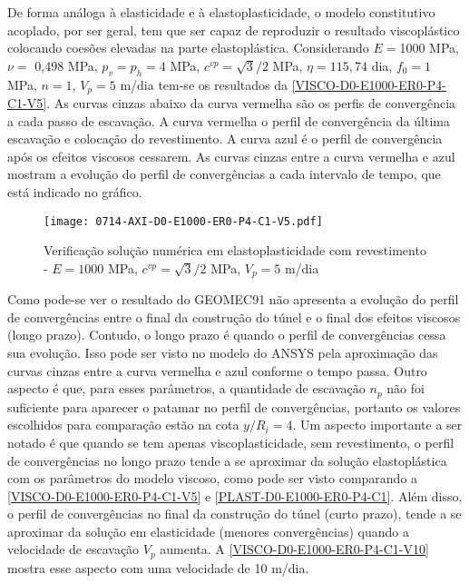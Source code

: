 De forma análoga à elasticidade e à elastoplasticidade, o modelo constitutivo acoplado, por ser geral, tem que ser capaz de reproduzir o resultado viscoplástico colocando coesões elevadas na parte elastoplástica.  Considerando $E =$1000  MPa, $\nu =$ 0,498 MPa, $p_v = p_h = 4$ MPa, $c^{vp} = \sqrt{3}/2$ MPa, $\eta = 115,74$ dia, $f_0=1$ MPa, $n=1$, $V_p = 5$ m/dia tem-se os resultados da \autoref{VISCO-D0-E1000-ER0-P4-C1-V5}. As curvas cinzas abaixo da curva vermelha são os perfis de convergência a cada passo de escavação. A curva vermelha o perfil de convergência da última escavação e colocação do revestimento. A curva azul é o perfil de convergência após os efeitos viscosos cessarem. As curvas cinzas entre a curva vermelha e azul mostram a evolução do perfil de convergências a cada intervalo de tempo, que está indicado no gráfico.
\begin{figure}[H]
	\begin{center}
		\texttt{[image: 0714-AXI-D0-E1000-ER0-P4-C1-V5.pdf]}
	\end{center}
	\caption{\label{VISCO-D0-E1000-ER0-P4-C1-V5}Verificação solução numérica em elastoplasticidade com revestimento - $E = 1000$ MPa, $c^{vp}=\sqrt{3}/2$ MPa, $V_p=5$ m/dia}
\end{figure}
Como pode-se ver o resultado do GEOMEC91 não apresenta a evolução do perfil de convergências entre o final da construção do túnel e o final dos efeitos viscosos (longo prazo). Contudo, o longo prazo é quando o perfil de convergências cessa sua evolução. Isso pode ser visto no modelo do ANSYS pela aproximação das curvas cinzas entre a curva vermelha e azul conforme o tempo passa. Outro aspecto é que, para esses parâmetros, a quantidade de escavação $n_p$ não foi suficiente para aparecer o patamar no perfil de convergências, portanto os valores escolhidos para comparação estão na cota $y/R_i=4$. Um aspecto importante a ser notado é que quando se tem apenas viscoplasticidade, sem revestimento, o perfil de convergências no longo prazo tende a se aproximar da solução elastoplástica com os parâmetros do modelo viscoso, como pode ser visto comparando a \autoref{VISCO-D0-E1000-ER0-P4-C1-V5} e \autoref{PLAST-D0-E1000-ER0-P4-C1}. Além disso, o perfil de convergências no final da construção do túnel (curto prazo), tende a se aproximar da solução em elasticidade (menores convergências) quando a velocidade de escavação $V_p$ aumenta. A \autoref{VISCO-D0-E1000-ER0-P4-C1-V10} mostra esse aspecto com uma velocidade de 10 m/dia.

